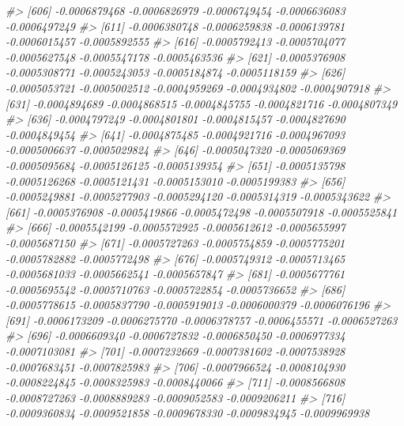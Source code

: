 \documentclass[
]{article}
\newenvironment{Shaded}{\begin{snugshade}}{\end{snugshade}}
\newcommand{\CommentTok}[1]{\textcolor[rgb]{0.56,0.35,0.01}{\textit{#1}}}
\begin{document}
\begin{Shaded}
\begin{Highlighting}[]
\CommentTok{\#\textgreater{} [606] {-}0.0006879468 {-}0.0006826979 {-}0.0006749454 {-}0.0006636083 {-}0.0006497249}
\CommentTok{\#\textgreater{} [611] {-}0.0006380748 {-}0.0006259838 {-}0.0006139781 {-}0.0006015457 {-}0.0005892555}
\CommentTok{\#\textgreater{} [616] {-}0.0005792413 {-}0.0005704077 {-}0.0005627548 {-}0.0005547178 {-}0.0005463536}
\CommentTok{\#\textgreater{} [621] {-}0.0005376908 {-}0.0005308771 {-}0.0005243053 {-}0.0005184874 {-}0.0005118159}
\CommentTok{\#\textgreater{} [626] {-}0.0005053721 {-}0.0005002512 {-}0.0004959269 {-}0.0004934802 {-}0.0004907918}
\CommentTok{\#\textgreater{} [631] {-}0.0004894689 {-}0.0004868515 {-}0.0004845755 {-}0.0004821716 {-}0.0004807349}
\CommentTok{\#\textgreater{} [636] {-}0.0004797249 {-}0.0004801801 {-}0.0004815457 {-}0.0004827690 {-}0.0004849454}
\CommentTok{\#\textgreater{} [641] {-}0.0004875485 {-}0.0004921716 {-}0.0004967093 {-}0.0005006637 {-}0.0005029824}
\CommentTok{\#\textgreater{} [646] {-}0.0005047320 {-}0.0005069369 {-}0.0005095684 {-}0.0005126125 {-}0.0005139354}
\CommentTok{\#\textgreater{} [651] {-}0.0005135798 {-}0.0005126268 {-}0.0005121431 {-}0.0005153010 {-}0.0005199383}
\CommentTok{\#\textgreater{} [656] {-}0.0005249881 {-}0.0005277903 {-}0.0005294120 {-}0.0005314319 {-}0.0005343622}
\CommentTok{\#\textgreater{} [661] {-}0.0005376908 {-}0.0005419866 {-}0.0005472498 {-}0.0005507918 {-}0.0005525841}
\CommentTok{\#\textgreater{} [666] {-}0.0005542199 {-}0.0005572925 {-}0.0005612612 {-}0.0005655997 {-}0.0005687150}
\CommentTok{\#\textgreater{} [671] {-}0.0005727263 {-}0.0005754859 {-}0.0005775201 {-}0.0005782882 {-}0.0005772498}
\CommentTok{\#\textgreater{} [676] {-}0.0005749312 {-}0.0005713465 {-}0.0005681033 {-}0.0005662541 {-}0.0005657847}
\CommentTok{\#\textgreater{} [681] {-}0.0005677761 {-}0.0005695542 {-}0.0005710763 {-}0.0005722854 {-}0.0005736652}
\CommentTok{\#\textgreater{} [686] {-}0.0005778615 {-}0.0005837790 {-}0.0005919013 {-}0.0006000379 {-}0.0006076196}
\CommentTok{\#\textgreater{} [691] {-}0.0006173209 {-}0.0006275770 {-}0.0006378757 {-}0.0006455571 {-}0.0006527263}
\CommentTok{\#\textgreater{} [696] {-}0.0006609340 {-}0.0006727832 {-}0.0006850450 {-}0.0006977334 {-}0.0007103081}
\CommentTok{\#\textgreater{} [701] {-}0.0007232669 {-}0.0007381602 {-}0.0007538928 {-}0.0007683451 {-}0.0007825983}
\CommentTok{\#\textgreater{} [706] {-}0.0007966524 {-}0.0008104930 {-}0.0008224845 {-}0.0008325983 {-}0.0008440066}
\CommentTok{\#\textgreater{} [711] {-}0.0008566808 {-}0.0008727263 {-}0.0008889283 {-}0.0009052583 {-}0.0009206211}
\CommentTok{\#\textgreater{} [716] {-}0.0009360834 {-}0.0009521858 {-}0.0009678330 {-}0.0009834945 {-}0.0009969938}

\end{Highlighting}
\end{Shaded}
\end{document}
